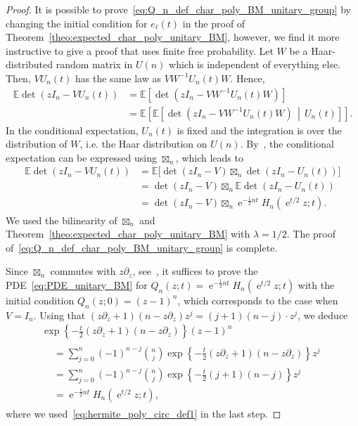 \documentclass[10pt]{amsart}
\theoremstyle{definition}\newtheorem{defi}[theo]{Definition}\newtheorem{rema}[theo]{Remark}\newtheorem{exam}[theo]{Example}\newtheorem{exem}[theo]{Example}\newtheorem{nota}[theo]{Notation}
\DeclareMathOperator{\eee}{e}
\newcommand{\E}{\mathbb{E}}
\begin{document}
\begin{proof}
It is possible to prove~\eqref{eq:Q_n_def_char_poly_BM_unitary_group} by changing the initial condition for $e_\ell(t)$ in the proof of Theorem~\ref{theo:expected_char_poly_unitary_BM}, however, we find it more instructive to give a proof that uses finite free probability. Let $W$ be a Haar-distributed random matrix in $U(n)$ which is independent of everything else. Then, $V U_n(t)$ has the same law as $V W^{-1} U_n(t) W$. Hence,
\begin{align*}
\E \det(z I_n - V U_n(t)) &=
\E \left[\det\left(z I_n - V W^{-1} U_n(t) W\right)\right]\\
&=
\E \left[\E \left[\det\left(z I_n - V W^{-1} U_n(t) W\right) \,\middle|\, U_n(t)\right]\right].
\end{align*}
In the conditional expectation, $U_n(t)$ is fixed and the integration is over the distribution of $W$, i.e. the Haar distribution on $U(n)$. By~\cite[Theorem~1.5]{marcus_spielman_srivastava}, the conditional expectation can be expressed using $\boxtimes_n$, which leads to
\begin{align*}
\E \det(z I_n - V U_n(t)) &=
\E \big[\det (z I_n-V) \boxtimes_n \det (z I_n-U_n(t))\big]\\
&=
\det (zI_n-V) \boxtimes_n \E \det (z I_n-U_n(t))\\
&=
\det (z I_n-V) \boxtimes_n \eee^{-\frac 12 n t} H_n\left(\eee^{t/2}z; t\right).
\end{align*}
We used the bilinearity of $\boxtimes_n$ and Theorem~\ref{theo:expected_char_poly_unitary_BM} with $\lambda = 1/2$. The proof of~\eqref{eq:Q_n_def_char_poly_BM_unitary_group} is complete.

Since $\boxtimes_n$ commutes with $z\partial_z$, see~\cite[p.~810]{marcus_spielman_srivastava}, it suffices to prove the PDE~\eqref{eq:PDE_unitary_BM} for $Q_n(z; t) = \eee^{-\frac 12 n t} H_n(\eee^{t/2}z; t)$ with the initial condition $Q_n(z;0) = (z-1)^n$, which corresponds to the case when $V= I_n$. Using that $(z \partial_z +1) (n- z\partial_z) z^j = {(j+1)(n-j)} \cdot z^j$, we deduce
\pagebreak
\begin{multline*}
\exp\left\{-\frac t2 (z \partial_z+1) (n- z\partial_z)\right\} (z-1)^n \\
\begin{aligned}
&=
\sum_{j=0}^n (-1)^{n-j} \binom nj \exp\left\{-\frac t2 (z \partial_z+1) (n- z\partial_z)\right\} z^j
\\
&=
\sum_{j=0}^n (-1)^{n-j} \binom nj \exp\left\{ - \frac {t}{2} (j+1) (n-j)\right\} z^j \\
&= \eee^{-\frac 12 n t} H_n\left(\eee^{t/2}z; t\right),
\end{aligned}
\end{multline*}
where we used~\eqref{eq:hermite_poly_circ_def1} in the last step.
\end{proof}
\end{document}
